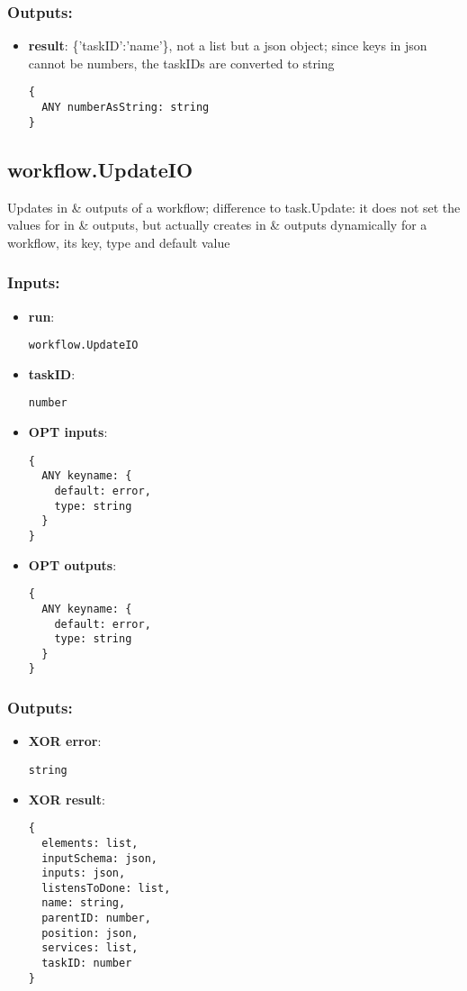 \subsubsection*{Outputs:}
\begin{itemize}
    \item \textbf{result}: \{'taskID':'name'\}, not a list but a json object; since keys in json cannot be numbers, the taskIDs are converted to string
\begin{lstlisting}
{
  ANY numberAsString: string
}
\end{lstlisting}
  \end{itemize}

\subsection{workflow.UpdateIO}
\label{ch:builtinservices:workflow.UpdateIO}
Updates
 in \& outputs of a workflow; difference to task.Update: it does not 
set the values for in \& outputs, but actually creates in \& 
outputs dynamically for a workflow, its key, type and default value
\subsubsection*{Inputs:}
\begin{itemize}
    \item \textbf{run}: 
\begin{lstlisting}
workflow.UpdateIO
\end{lstlisting}
    \item \textbf{taskID}: 
\begin{lstlisting}
number
\end{lstlisting}
    \item \textbf{OPT inputs}: 
\begin{lstlisting}
{
  ANY keyname: {
    default: error, 
    type: string
  }
}
\end{lstlisting}
    \item \textbf{OPT outputs}: 
\begin{lstlisting}
{
  ANY keyname: {
    default: error, 
    type: string
  }
}
\end{lstlisting}
  \end{itemize}

\subsubsection*{Outputs:}
\begin{itemize}
    \item \textbf{XOR error}: 
\begin{lstlisting}
string
\end{lstlisting}
    \item \textbf{XOR result}: 
\begin{lstlisting}
{
  elements: list, 
  inputSchema: json, 
  inputs: json, 
  listensToDone: list, 
  name: string, 
  parentID: number, 
  position: json, 
  services: list, 
  taskID: number
}
\end{lstlisting}
  \end{itemize}

